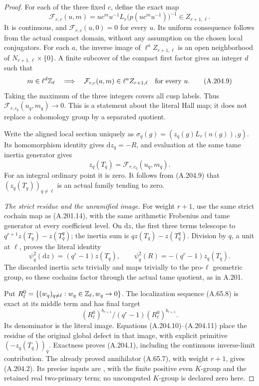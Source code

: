 \begin{proof}
For each of the three fixed \(c\), define the exact map
\[
 \mathcal F_{r,c}(u,m)=
 u c^m u^{-1}L_r\bigl(p(u c^m u^{-1})\bigr)^{-1}
                  \in Z_{r+1,\ell}.
\tag{A.204.8}
\]
It is continuous, and \(\mathcal F_{r,c}(u,0)=0\) for
every \(u\).  Its uniform consequence follows from the
actual compact domain, without any assumption on the
chosen local conjugators.  For each \(a\), the inverse
image of \(\ell^aZ_{r+1,\ell}\) is an open neighborhood
of \(N_{r+1,\ell}\times\{0\}\).  A finite subcover of
the compact first factor gives an integer \(d\) such that
\[
 m\in\ell^d\mathbb Z_\ell\quad\Longrightarrow\quad
 \mathcal F_{r,c}(u,m)\in\ell^aZ_{r+1,\ell}
                    \quad\hbox{for every }u.
\tag{A.204.9}
\]
Taking the maximum of the three integers covers all cusp
labels.  Thus \(\mathcal F_{r,c_q}(u_q,m_q)\to0\).
This is a statement about the literal Hall map; it does
not replace a cohomology group by a separated quotient.

Write the aligned local section uniquely as
\(\sigma_q(g)=(z_q(g)L_r(n(g)),g)\).
Its homomorphism identity gives \(\mathrm dz_q=-R\),
and evaluation at the same tame inertia generator gives
\[
                  z_q(T_q)=\mathcal F_{r,c_q}(u_q,m_q).
\tag{A.204.10}
\]
For an integral ordinary point it is zero.  It follows
from (A.204.9) that \((z_q(T_q))_{q\ne\ell}\) is an
actual family tending to zero.

\emph{The strict residue and the unramified image.}
For weight \(r+1\), use the same strict cochain map as
(A.201.14), with the same arithmetic Frobenius and tame
generator at every coefficient level.  On \(\mathrm dz\),
the first three terms telescope to
\(q^{r+1}z(T_q)-z(T_q^q)\); the inertia sum is
\(qz(T_q)-z(T_q^q)\).  Division by \(q\), a unit at
\(\ell\), proves the literal identity
\[
 \psi_q^2(\mathrm dz)=(q^r-1)z(T_q),\qquad
 \psi_q^2(R)=-(q^r-1)z_q(T_q).
\tag{A.204.11}
\]
The discarded inertia acts trivially and maps trivially
to the pro-\(\ell\) geometric group, so these cochains
factor through the actual tame quotient, as in A.201.

Put \(R_\ell^0=\{(w_q)_{q\ne\ell}:w_q\in\mathbb Z_\ell,
w_q\to0\}\).  The localization sequence (A.65.8) is
exact at its middle term and has final target
\[
          (R_\ell^0)^{b_{r+1}}/
             (q^r-1)(R_\ell^0)^{b_{r+1}}.
\tag{A.204.12}
\]
Its denominator is the literal image.  Equations
(A.204.10)--(A.204.11) place the residue of the original
global defect in that image, with explicit primitive
\((-z_q(T_q))_q\).  Exactness proves (A.204.1), including
the continuous inverse-limit contribution.
The already proved annihilator (A.65.7), with weight
\(r+1\), gives (A.204.2).  Its precise inputs are
\cite[VI, Theorems 8.2 and 9.11]{Weibel2013}, with
the finite positive even \(K\)-group and the retained
real two-primary term; no uncomputed \(K\)-group is
declared zero here.


\end{proof}
